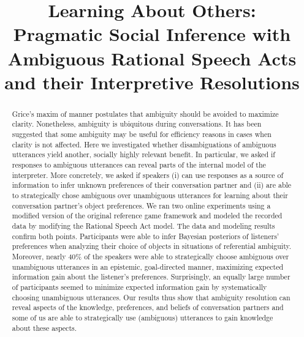 \documentclass[10pt,a4paper]{article}
\title{Learning About Others:\\
	Pragmatic Social Inference with Ambiguous Rational Speech Acts
	and their Interpretive Resolutions}
\begin{document}
\maketitle

\begin{abstract}
Grice's maxim of manner postulates that ambiguity should be avoided to maximize clarity.
Nonetheless, ambiguity is ubiquitous during conversations.
It has been suggested that some ambiguity may be useful for efficiency reasons in cases when clarity is not affected.
Here we investigated whether disambiguations of ambiguous utterances yield another, socially highly relevant benefit.
In particular, we asked if responses to ambiguous utterances can reveal parts of the internal model of the interpreter. 
More concretely, we asked if speakers (i) can use responses as a source of information to infer unknown preferences of their conversation partner and (ii) are able to strategically chose ambiguous over unambiguous utterances for learning about their conversation partner's object preferences. 
We ran two online experiments using a modified version of the original reference game framework \cite{frankgoodman2012} and modeled the recorded data by modifying the Rational Speech Act model.
The data and modeling results confirm both points. 
Participants were able to infer Bayesian posteriors of listeners' preferences when analyzing their choice of objects in situations of referential ambiguity.
Moreover, nearly 40\% of the speakers were able to strategically choose ambiguous over unambiguous utterances in an epistemic, goal-directed manner, maximizing expected information gain about the listener's preferences.
Surprisingly, an equally large number of participants seemed to minimize expected information gain by systematically choosing unambiguous utterances. 
Our results thus show that ambiguity resolution can reveal aspects of the knowledge, preferences, and beliefs of conversation partners and some of us are able to strategically use (ambiguous) utterances to gain knowledge about these aspects.

\end{abstract}
\end{document}
